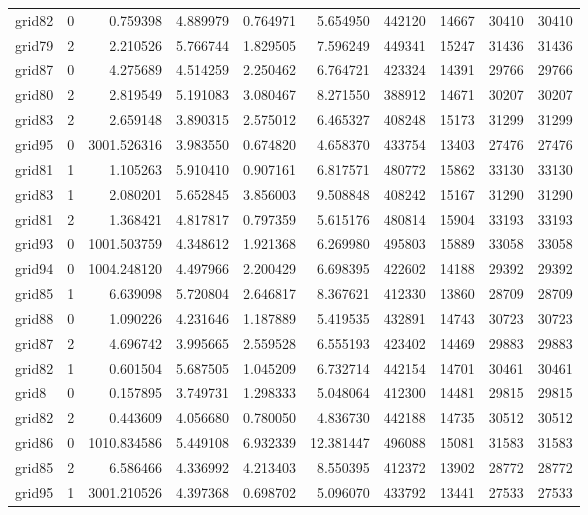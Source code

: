 \begin{longtable}{|l|r|r|r|r|r|r|r|r|r|}
grid82 & 0 & 0.759398 & 4.889979 & 0.764971 & 5.654950 & 442120 & 14667 & 30410 & 30410 \\
grid79 & 2 & 2.210526 & 5.766744 & 1.829505 & 7.596249 & 449341 & 15247 & 31436 & 31436 \\
grid87 & 0 & 4.275689 & 4.514259 & 2.250462 & 6.764721 & 423324 & 14391 & 29766 & 29766 \\
grid80 & 2 & 2.819549 & 5.191083 & 3.080467 & 8.271550 & 388912 & 14671 & 30207 & 30207 \\
grid83 & 2 & 2.659148 & 3.890315 & 2.575012 & 6.465327 & 408248 & 15173 & 31299 & 31299 \\
grid95 & 0 & 3001.526316 & 3.983550 & 0.674820 & 4.658370 & 433754 & 13403 & 27476 & 27476 \\
grid81 & 1 & 1.105263 & 5.910410 & 0.907161 & 6.817571 & 480772 & 15862 & 33130 & 33130 \\
grid83 & 1 & 2.080201 & 5.652845 & 3.856003 & 9.508848 & 408242 & 15167 & 31290 & 31290 \\
grid81 & 2 & 1.368421 & 4.817817 & 0.797359 & 5.615176 & 480814 & 15904 & 33193 & 33193 \\
grid93 & 0 & 1001.503759 & 4.348612 & 1.921368 & 6.269980 & 495803 & 15889 & 33058 & 33058 \\
grid94 & 0 & 1004.248120 & 4.497966 & 2.200429 & 6.698395 & 422602 & 14188 & 29392 & 29392 \\
grid85 & 1 & 6.639098 & 5.720804 & 2.646817 & 8.367621 & 412330 & 13860 & 28709 & 28709 \\
grid88 & 0 & 1.090226 & 4.231646 & 1.187889 & 5.419535 & 432891 & 14743 & 30723 & 30723 \\
grid87 & 2 & 4.696742 & 3.995665 & 2.559528 & 6.555193 & 423402 & 14469 & 29883 & 29883 \\
grid82 & 1 & 0.601504 & 5.687505 & 1.045209 & 6.732714 & 442154 & 14701 & 30461 & 30461 \\
grid8 & 0 & 0.157895 & 3.749731 & 1.298333 & 5.048064 & 412300 & 14481 & 29815 & 29815 \\
grid82 & 2 & 0.443609 & 4.056680 & 0.780050 & 4.836730 & 442188 & 14735 & 30512 & 30512 \\
grid86 & 0 & 1010.834586 & 5.449108 & 6.932339 & 12.381447 & 496088 & 15081 & 31583 & 31583 \\
grid85 & 2 & 6.586466 & 4.336992 & 4.213403 & 8.550395 & 412372 & 13902 & 28772 & 28772 \\
grid95 & 1 & 3001.210526 & 4.397368 & 0.698702 & 5.096070 & 433792 & 13441 & 27533 & 27533 \\

\end{longtable}
